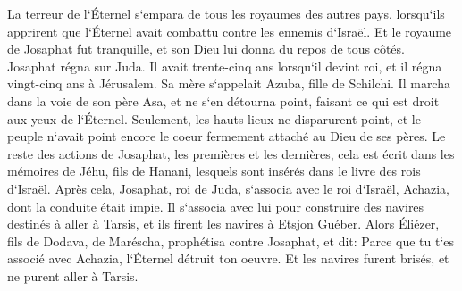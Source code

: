 \verse La terreur de l`Éternel s`empara de tous les royaumes des autres pays, lorsqu`ils apprirent que l`Éternel avait combattu contre les ennemis d`Israël. 
\verse Et le royaume de Josaphat fut tranquille, et son Dieu lui donna du repos de tous côtés. 
\verse Josaphat régna sur Juda. Il avait trente-cinq ans lorsqu`il devint roi, et il régna vingt-cinq ans à Jérusalem. Sa mère s`appelait Azuba, fille de Schilchi. 
\verse Il marcha dans la voie de son père Asa, et ne s`en détourna point, faisant ce qui est droit aux yeux de l`Éternel. 
\verse Seulement, les hauts lieux ne disparurent point, et le peuple n`avait point encore le coeur fermement attaché au Dieu de ses pères. 
\verse Le reste des actions de Josaphat, les premières et les dernières, cela est écrit dans les mémoires de Jéhu, fils de Hanani, lesquels sont insérés dans le livre des rois d`Israël. 
\verse Après cela, Josaphat, roi de Juda, s`associa avec le roi d`Israël, Achazia, dont la conduite était impie. 
\verse Il s`associa avec lui pour construire des navires destinés à aller à Tarsis, et ils firent les navires à Etsjon Guéber. 
\verse Alors Éliézer, fils de Dodava, de Maréscha, prophétisa contre Josaphat, et dit: Parce que tu t`es associé avec Achazia, l`Éternel détruit ton oeuvre. Et les navires furent brisés, et ne purent aller à Tarsis. 

